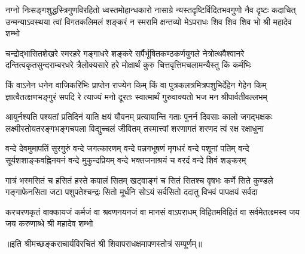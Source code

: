 \fourlineindentedshloka
{नग्नो निःसङ्गशुद्धस्त्रिगुणविरहितो ध्वस्तमोहान्धकारो}
{नासाग्रे न्यस्तदृष्टिर्विदितभवगुणो नैव दृष्टः कदाचित्}
{उन्मन्याऽवस्थया त्वां विगतकलिमलं शङ्करं न स्मरामि}
{क्षन्तव्यो मेऽपराधः शिव शिव शिव भो श्री महादेव शम्भो} %

\fourlineindentedshloka
{चन्द्रोद्भासितशेखरे स्मरहरे गङ्गाधरे शङ्करे}
{सर्पैर्भूषितकण्ठकर्णयुगले नेत्रोत्थवैश्वानरे}
{दन्तित्वकृतसुन्दराम्बरधरे त्रैलोक्यसारे हरे}
{मोक्षार्थं कुरु चित्तवृत्तिमचलामन्यैस्तु किं कर्मभिः} %


\fourlineindentedshloka
{किं वाऽनेन धनेन वाजिकरिभिः प्राप्तेन राज्येन किम्}
{किं वा पुत्रकलत्रमित्रपशुभिर्देहेन गेहेन किम्}
{ज्ञात्वैतत्क्षणभङ्गुरं सपदि रे त्याज्यं मनो दूरतः}
{स्वात्मार्थं गुरुवाक्यतो भज मन श्रीपार्वतीवल्लभम्} %

\fourlineindentedshloka
{आयुर्नश्यति पश्यतां प्रतिदिनं याति क्षयं यौवनम्}
{प्रत्यायान्ति गताः पुनर्न दिवसाः कालो जगद्भक्षकः}
{लक्ष्मीस्तोयतरङ्गभङ्गचपला विद्युच्चलं जीवितम्}
{तस्मात्त्वां शरणागतं शरणद त्वं रक्ष रक्षाधुना} %


\fourlineindentedshloka
{वन्दे देवमुमापतिं सुरगुरुं वन्दे जगत्कारणम्}
{वन्दे पन्नगभूषणं मृगधरं वन्दे पशूनां पतिम्}
{वन्दे सूर्यशशाङ्कवह्निनयनं वन्दे मुकुन्दप्रियम्}
{वन्दे भक्तजनाश्रयं च वरदं वन्दे शिवं शङ्करम्} %

\fourlineindentedshloka
{गात्रं भस्मसितं च हसितं हस्ते कपालं सितम्}
{खट्वाङ्गं च सितं सितश्च वृषभः कर्णे सिते कुण्डले}
{गङ्गाफेनसिता जटा पशुपतेश्चन्द्रः सितो मूर्धनि}
{सोऽयं सर्वसितो ददातु विभवं पापक्षयं सर्वदा} %

\fourlineindentedshloka
{करचरणकृतं वाक्कायजं कर्मजं वा}
{श्रवणनयनजं वा मानसं वाऽपराधम्}
{विहितमविहितं वा सर्वमेतत्क्ष्मस्व}
{जय जय करुणाब्धे श्री महादेव शम्भो} %


॥इति श्रीमच्छङ्कराचार्यविरचितं श्री शिवापराधक्षमापणस्तोत्रं सम्पूर्णम्॥
\setlength{\shlokaspaceskip}{24pt}